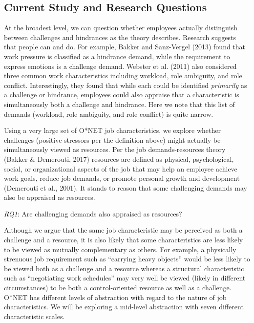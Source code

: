 \documentclass[
  man]{apa6}
\begin{document}
\hypertarget{current-study-and-research-questions}{%
\subsection{Current Study and Research Questions}\label{current-study-and-research-questions}}

At the broadest level, we can question whether employees actually distinguish between challenges and hindrances as the theory describes. Research suggests that people can and do. For example, Bakker and Sanz-Vergel (2013) found that work pressure is classified as a hindrance demand, while the requirement to express emotions is a challenge demand. Webster et al. (2011) also considered three common work characteristics including workload, role ambiguity, and role conflict. Interestingly, they found that while each could be identified \emph{primarily} as a challenge or hindrance, employees could also appraise that a characteristic is simultaneously both a challenge and hindrance. Here we note that this list of demands (workload, role ambiguity, and role conflict) is quite narrow.

Using a very large set of O*NET job characteristics, we explore whether challenges (positive stressors per the definition above) might actually be simultaneously viewed as resources. Per the job demands-resources theory (Bakker \& Demerouti, 2017) resources are defined as physical, psychological, social, or organizational aspects of the job that may help an employee achieve work goals, reduce job demands, or promote personal growth and development (Demerouti et al., 2001). It stands to reason that some challenging demands may also be appraised as resources.

\emph{RQ1}: Are challenging demands also appraised as resources?

Although we argue that the same job characteristic may be perceived as both a challenge and a resource, it is also likely that some characteristics are less likely to be viewed as mutually complementary as others. For example, a physically strenuous job requirement such as ``carrying heavy objects'' would be less likely to be viewed both as a challenge and a resource whereas a structural characteristic such as ``negotiating work schedules'' may very well be viewed (likely in different circumstances) to be both a control-oriented resource as well as a challenge. O*NET has different levels of abstraction with regard to the nature of job characteristics. We will be exploring a mid-level abstraction with seven different characteristic scales.
\end{document}

